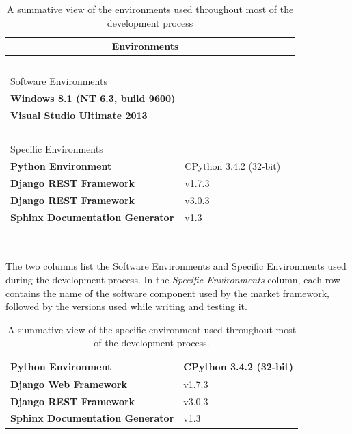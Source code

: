 \documentclass[bsc,frontabs,twoside,singlespacing,parskip,deptreport]{infthesis}     %
\begin{document}
\begin {table}
\caption{A summative view of the environments used throughout most of the development process}

\begin{tabular}{llr}

\multicolumn{2}{c}{Environments}  \\
\hline
\    \\
Software Environments       \\
\hline
\textbf{Windows 8.1 (NT 6.3, build 9600)} \\
 \textbf{Visual Studio Ultimate 2013}   \\
\hline
\     \\

Specific Environments \\
\hline

 \textbf{Python Environment} & CPython 3.4.2 (32-bit)      \\
 \textbf{Django REST Framework}  & v1.7.3      \\
   \textbf{Django REST Framework} & v3.0.3     \\
  \textbf{Sphinx Documentation Generator}                & v1.3         \\
\hline
\end{tabular}
\hfill
\ \\
\label{tab:dev-env}

{The two columns list the Software Environments  and Specific Environments  used during the development process. In the {\it Specific Environments} column, each row contains the name of the software component used by the market framework, followed by the versions used while writing and testing it. }
\end{table}

\begin{table}[h]
\centering
\caption{A summative view of the specific environment used throughout most of the development process.}

\begin{tabular}{|l|l|}
\hline
\textbf{Python Environment}    & CPython 3.4.2 (32-bit)          \\ \hline
\textbf{Django Web Framework}  & v1.7.3                         \\ \hline
\textbf{Django REST Framework} & v3.0.3                            \\ \hline
\textbf{Sphinx Documentation Generator}                & v1.3                          \\ \hline
\end{tabular}
\label{tab:dev-env}
 
\end{table}
\end{document}
